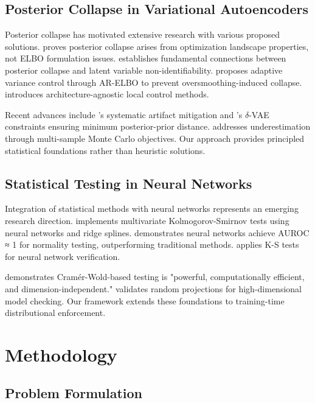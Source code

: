 \documentclass{article}
\begin{document}
\subsection{Posterior Collapse in Variational Autoencoders}

Posterior collapse has motivated extensive research with various proposed solutions. \citet{lucas2019don} proves posterior collapse arises from optimization landscape properties, not ELBO formulation issues. \citet{wang2023posterior} establishes fundamental connections between posterior collapse and latent variable non-identifiability. \citet{takida2022preventing} proposes adaptive variance control through AR-ELBO to prevent oversmoothing-induced collapse. \citet{song2024toward} introduces architecture-agnostic local control methods.

Recent advances include \citet{novitskiy2025vivat}'s systematic artifact mitigation and \citet{razavi2019preventing}'s $\delta$-VAE constraints ensuring minimum posterior-prior distance. \citet{melis2022mutual} addresses underestimation through multi-sample Monte Carlo objectives. Our approach provides principled statistical foundations rather than heuristic solutions.

\subsection{Statistical Testing in Neural Networks}

Integration of statistical methods with neural networks represents an emerging research direction. \citet{paik2023maximum} implements multivariate Kolmogorov-Smirnov tests using neural networks and ridge splines. \citet{simic2020testing} demonstrates neural networks achieve AUROC ≈ 1 for normality testing, outperforming traditional methods. \citet{bosman2023robustness} applies K-S tests for neural network verification.

\citet{fraiman2021application} demonstrates Cramér-Wold-based testing is "powerful, computationally efficient, and dimension-independent." \citet{chen2024model} validates random projections for high-dimensional model checking. Our framework extends these foundations to training-time distributional enforcement.

\section{Methodology}

\subsection{Problem Formulation}
\end{document}
